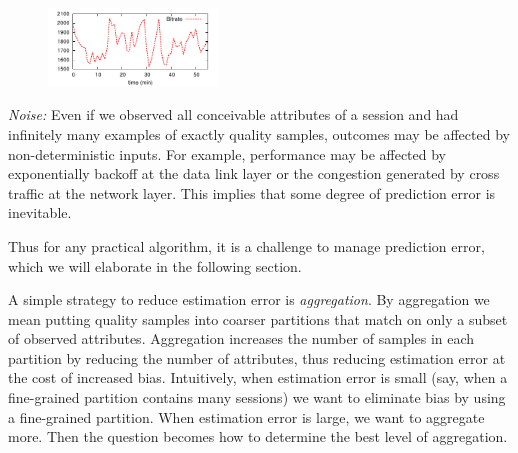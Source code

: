 \begin{packedenumerate}
\begin{figure}[h!]
\centering
 \includegraphics[width=0.4\textwidth] {figures/quality-time.pdf}
\label{fig:quality-variability}
\end{figure}

  \item \emph{Noise:} Even if we observed all conceivable attributes of a session and had infinitely many examples of exactly quality samples, outcomes may be affected by non-deterministic inputs.  For example, performance may be affected by exponentially backoff at the data link layer or the congestion generated by cross traffic at the network layer. This implies that some degree of prediction error is inevitable.
\end{packedenumerate}


Thus for any practical algorithm, it is a challenge to manage prediction error, which we will elaborate in the following section.

\label{subsec:aggregation}
A simple strategy to reduce estimation error is {\it aggregation}.  By
aggregation we mean putting quality samples into coarser partitions
that match on only a subset of observed attributes.  Aggregation
increases the number of samples in each partition by reducing the
number of attributes, thus reducing estimation error at the cost of
increased bias.  Intuitively, when estimation error is small (say,
when a fine-grained partition contains many sessions) we want to
eliminate bias by using a fine-grained partition.  When estimation
error is large, we want to aggregate more.  Then the question becomes
how to determine the best level of aggregation.


